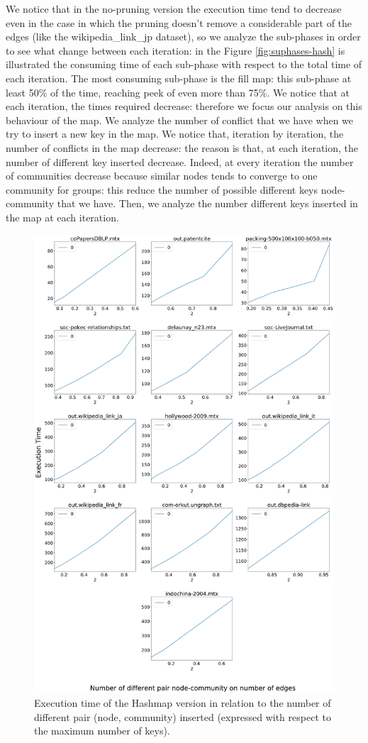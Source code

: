 We notice that in the no-pruning version the execution time tend to decrease even in the case in which the pruning doesn't remove a considerable part of the edges (like the wikipedia\_link\_jp dataset), so we analyze the sub-phases in order to see what change between each iteration: in the Figure \ref{fig:suphases-hash} is illustrated the consuming time of each sub-phase with respect to the total time of each iteration.
The most consuming sub-phase is the fill map:  this sub-phase at least 50\% of the time, reaching peek of even more than 75\%. We notice that at each iteration, the times required decrease: therefore we focus our analysis on this behaviour of the map. We analyze the number of conflict that we have when we try to insert a new key in the map. 
We notice that, iteration by iteration, the number of conflicts in the map decrease: the reason is that, at each iteration, the number of different key inserted decrease. Indeed, at every iteration the number of communities decrease because similar nodes tends to converge to one community for groups: this reduce the number of possible different keys node-community that we have. 
Then, we analyze the number different keys inserted in the map at each iteration.\\
\begin{figure}[t!]
	\centering
	\includegraphics[width=0.7\linewidth]{0-resources/time-vs-possible-keys}
	\caption{Execution time of the Hashmap version in relation to the number of different pair (node, community) inserted (expressed with respect to the maximum number of keys).}
	\label{fig:time-vs-possible-keys}
\end{figure}
